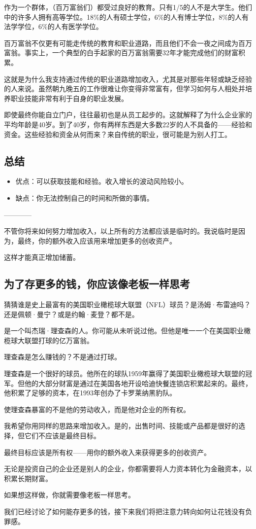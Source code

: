 作为一个群体，（百万富翁们）都受过良好的教育。只有1/5的人不是大学生。他们中的许多人拥有高等学位。18\%的人有硕士学位，6\%的人有博士学位，8\%的人有法学学位，6\%的人有医学学位。

百万富翁不仅更有可能走传统的教育和职业道路，而且他们不会一夜之间成为百万富翁。事实上，一个典型的白手起家的百万富翁需要32年才能完成他们的财富积累。

这就是为什么我支持通过传统的职业道路增加收入，尤其是对那些年轻或缺乏经验的人来说。虽然朝九晚五的工作很难让你变得非常富有，但学习如何与人相处并培养职业技能非常有利于自身的职业发展。

即使最终你能自立门户，往往最初也是从员工起步的。这就解释了为什么企业家的平均年龄是40岁。到了40岁，你有两样东西是大多数22岁的人不具备的——经验和资金。这些经验和资金从何而来？来自传统的职业，很可能是为别人打工。

\subsection{总结}
\begin{itemize}
\item 优点：可以获取技能和经验。收入增长的波动风险较小。
\item 缺点：你无法控制自己的时间和所做的事情。
\end{itemize}

\begin{center}
————
\end{center}


不管你将来如何努力增加收入，以上所有的方法都应该是临时的。我说临时是因为，最终，你的额外收入应该用来增加更多的创收资产。

这样才能真正增加储蓄。

\subsection{为了存更多的钱，你应该像老板一样思考}
猜猜谁是史上最富有的美国职业橄榄球大联盟（NFL）球员？是汤姆·布雷迪吗？还是佩顿·曼宁？或是约翰·麦登？都不是。

是一个叫杰瑞·理查森的人。你可能从未听说过他。但他是唯一一个在美国职业橄榄球大联盟打球的亿万富翁。

理查森是怎么赚钱的？不是通过打球。

理查森是一个很好的球员。他所在的球队1959年赢得了美国职业橄榄球大联盟的冠军。但他的大部分财富是通过在美国各地开设哈迪快餐连锁店积累起来的。最终，他积累了足够的资本，在1993年创办了卡罗莱纳黑豹队。

使理查森暴富的不是他的劳动收入，而是他对企业的所有权。

我希望你用同样的思路来增加收入。是的，出售时间、技能或产品都是很好的选择，但它们不应该是最终目标。

最终目标应该是所有权——用你的额外收入来获得更多的创收资产。

无论是投资自己的企业还是别人的企业，你都需要将人力资本转化为金融资本，以积累长期财富。

如果想这样做，你就需要像老板一样思考。

我们已经讨论了如何能存更多的钱，接下来我们将把注意力转向如何让花钱没有负罪感。

